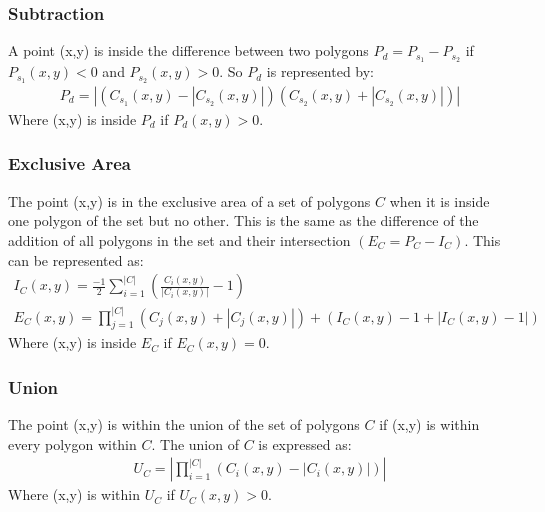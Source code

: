 \documentclass[11pt]{article}
\begin{document}
\subsubsection{Subtraction}
A point (x,y) is inside the difference between two polygons \(P_d=P_{s_1}-P_{s_2}\) if \(P_{s_1}(x,y)<0\) and \(P_{s_2}(x,y) > 0\). So \(P_d\) is represented by:
\begin{gather*}
P_d=\left|(C_{s_1}(x,y)-|C_{s_2}(x,y)|)(C_{s_2}(x,y)+|C_{s_2}(x,y)|)\right|
\end{gather*}
Where (x,y) is inside \(P_d\) if \(P_d(x,y)>0\).\\

\subsubsection{Exclusive Area}
The point (x,y) is in the exclusive area of a set of polygons \(C\) when it is inside one polygon of the set but no other. This is the same as the difference of the addition of all polygons in the set and their intersection \((E_C=P_C-I_C)\). This can be represented as:
\begin{gather*}
I_C(x,y)=\frac{-1}{2}\sum_{i=1}^{|C|}\left(\frac{C_i(x,y)}{|C_i(x,y)|}-1\right)\\
E_C(x,y)=\prod_{j=1}^{|C|}(C_j(x,y)+|C_j(x,y)|)+(I_C(x,y)-1+|I_C(x,y)-1|)
\end{gather*}
Where (x,y) is inside \(E_C\) if \(E_C(x,y)=0\).

\subsubsection{Union}
The point (x,y) is within the union of the set of polygons \(C\) if (x,y) is within every polygon within \(C\). The union of \(C\) is expressed as:
\begin{gather*}
U_C=\left|\prod_{i=1}^{|C|}(C_i(x,y)-|C_i(x,y)|)\right|
\end{gather*}
Where (x,y) is within \(U_C\) if \(U_C(x,y)>0\).
\end{document}
